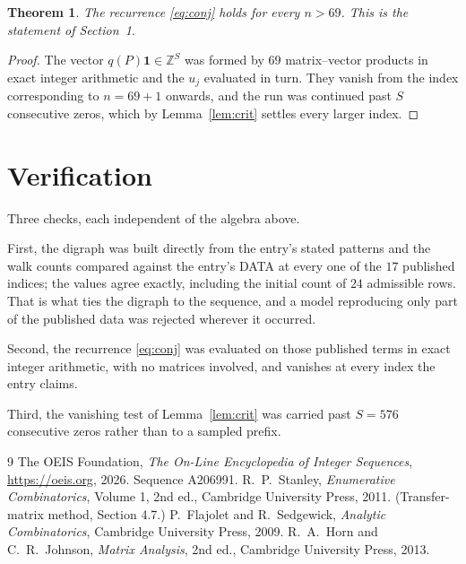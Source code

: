 \documentclass[11pt,a4paper]{article}
\theoremstyle{plain}
\newtheorem{theorem}{Theorem}
\theoremstyle{definition}
\begin{document}
\begin{theorem}
The recurrence \eqref{eq:conj} holds for every $n>69$. This is the statement of
Section~1.
\end{theorem}

\begin{proof}
The vector $q(P)\mathbf{1}\in\mathbb{Z}^{S}$ was formed by $69$ matrix--vector
products in exact integer arithmetic and the $u_j$ evaluated in turn. They vanish from the
index corresponding to $n=69+1$ onwards, and the run was continued past $S$ consecutive
zeros, which by Lemma~\ref{lem:crit} settles every larger index.
\end{proof}

\section{Verification}

Three checks, each independent of the algebra above.

First, the digraph was built directly from the entry's stated patterns and the walk counts
compared against the entry's DATA at every one of the $17$ published indices; the
values agree exactly, including the initial count of $24$ admissible rows. That is
what ties the digraph to the sequence, and a model reproducing only part of the published
data was rejected wherever it occurred.

Second, the recurrence \eqref{eq:conj} was evaluated on those published terms in exact
integer arithmetic, with no matrices involved, and vanishes at every index the entry claims.

Third, the vanishing test of Lemma~\ref{lem:crit} was carried past $S=576$ consecutive
zeros rather than to a sampled prefix.

\begin{thebibliography}{9}
 The OEIS Foundation, \emph{The On-Line Encyclopedia of Integer
Sequences}, \url{https://oeis.org}, 2026. Sequence A206991.
 R.~P.~Stanley, \emph{Enumerative Combinatorics}, Volume 1, 2nd ed.,
Cambridge University Press, 2011. (Transfer-matrix method, Section 4.7.)
 P.~Flajolet and R.~Sedgewick, \emph{Analytic Combinatorics}, Cambridge
University Press, 2009.
 R.~A.~Horn and C.~R.~Johnson, \emph{Matrix Analysis}, 2nd ed., Cambridge
University Press, 2013.
\end{thebibliography}
\end{document}
